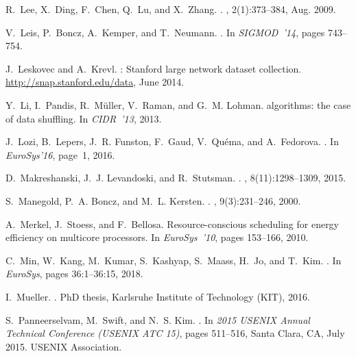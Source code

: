 \documentclass[11pt]{article}
\begin{document}
\begin{thebibliography}{10}
\begin{small}
R.~Lee, X.~Ding, F.~Chen, Q.~Lu, and X.~Zhang.
.
, 2(1):373--384, Aug. 2009.

V.~Leis, P.~Boncz, A.~Kemper, and T.~Neumann.
.
\newblock In {\em SIGMOD~'14}, pages 743--754.

J.~Leskovec and A.~Krevl.
: {Stanford} large network dataset collection.
\newblock \url{http://snap.stanford.edu/data}, June 2014.

Y.~Li, I.~Pandis, R.~M{\"u}ller, V.~Raman, and G.~M. Lohman.
 algorithms: the case of data shuffling.
\newblock In {\em CIDR~'13}, 2013.

J.~Lozi, B.~Lepers, J.~R. Funston, F.~Gaud, V.~Qu{\'{e}}ma, and A.~Fedorova.
.
\newblock In {\em EuroSys'16}, page~1, 2016.

D.~Makreshanski, J.~J. Levandoski, and R.~Stutsman.
.
, 8(11):1298--1309, 2015.

S.~Manegold, P.~A. Boncz, and M.~L. Kersten.
.
, 9(3):231--246, 2000.

A.~Merkel, J.~Stoess, and F.~Bellosa.
\newblock Resource-conscious scheduling for energy efficiency on multicore
  processors.
\newblock In {\em {EuroSys~'10}}, pages 153--166, 2010.

C.~Min, W.~Kang, M.~Kumar, S.~Kashyap, S.~Maass, H.~Jo, and T.~Kim.
.
\newblock In {\em EuroSys}, pages 36:1--36:15, 2018.

I.~Mueller.
.
\newblock PhD thesis, Karlsruhe Institute of Technology (KIT), 2016.

S.~Panneerselvam, M.~Swift, and N.~S. Kim.
.
\newblock In {\em 2015 USENIX Annual Technical Conference (USENIX ATC 15)},
  pages 511--516, Santa Clara, CA, July 2015. USENIX Association.


\end{small}
\end{thebibliography}
\end{document}
